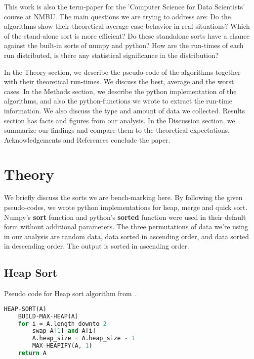 \documentclass[sigconf, nonacm, natbib, screen, balance=False]{acmart}
\begin{document}
This work is also the term-paper for the 'Computer Science for Data Scientists' course at NMBU. \label{questions}The main questions we are trying to address are: Do the algorithms show their theoretical average case behavior in real situations? Which of the stand-alone sort is more efficient? Do these standalone sorts have a chance against the built-in sorts of numpy and python? How are the run-times of each run distributed, is there any statistical significance in the distribution? 

In the Theory section, we describe the pseudo-code of the algorithms together with their theoretical run-times. We discuss the best, average and the worst cases.  In the Methods section, we describe the python implementation of the algorithms, and also the python-functions we wrote to extract the run-time information. We also discuss the type and amount of data we collected. Results section has facts and figures from our analysis. In the Discussion section, we summarize our findings and compare them to the theoretical expectations. Acknowledgements and References conclude the paper.

\section{Theory}\label{sec:theory}
We briefly discuss the sorts we are bench-marking here. By following the given pseudo-codes, we wrote python implementations for heap, merge and quick sort. Numpy's \textbf{sort} function and python's \textbf{sorted} function were used in their default form without additional parameters. The three permutations of data we're using in our analysis are random data, data sorted in ascending order, and data sorted in descending order. The output is sorted in ascending order.

\subsection{Heap Sort}\label{sec:heap sort}

\begin{listing}
\caption{Pseudo code for Heap sort algorithm from \citet[Ch.~6.4]{CLRS_2009}.}
\label{lst:heap_algo}
\begin{lstlisting}[language=Python]
HEAP-SORT(A)
    BUILD-MAX-HEAP(A)
    for i = A.length downto 2
        swap A[1] and A[i]
        A.heap_size = A.heap_size - 1
        MAX-HEAPIFY(A, 1)
    return A
\end{lstlisting}
\end{listing}
\end{document}
